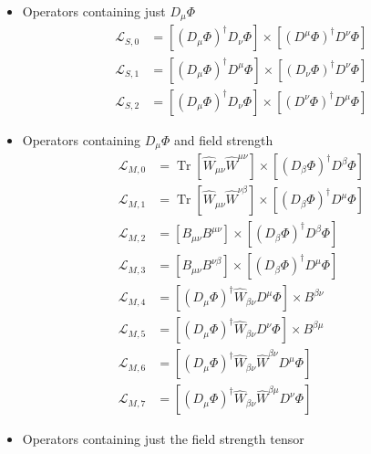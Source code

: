 \begin{itemize}
\item Operators containing just $D_\mu \Phi$
\begin{equation}
\begin{aligned}
\mathcal{L}_{S, 0} &=\left[\left(D_{\mu} \Phi\right)^{\dagger} D_{\nu} \Phi\right] \times\left[\left(D^{\mu} \Phi\right)^{\dagger} D^{\nu} \Phi\right] \\
\mathcal{L}_{S, 1} &=\left[\left(D_{\mu} \Phi\right)^{\dagger} D^{\mu} \Phi\right] \times\left[\left(D_{\nu} \Phi\right)^{\dagger} D^{\nu} \Phi\right] \\
\mathcal{L}_{S, 2} &=\left[\left(D_{\mu} \Phi\right)^{\dagger} D_{\nu} \Phi\right] \times\left[\left(D^{\nu} \Phi\right)^{\dagger} D^{\mu} \Phi\right]
\end{aligned}
\end{equation}
\item Operators containing $D_\mu \Phi$ and field strength 
\begin{equation}
\begin{aligned}
\mathcal{L}_{M, 0} &=\operatorname{Tr}\left[\hat{W}_{\mu \nu} \hat{W}^{\mu \nu}\right] \times\left[\left(D_{\beta} \Phi\right)^{\dagger} D^{\beta} \Phi\right] \\
\mathcal{L}_{M, 1} &=\operatorname{Tr}\left[\hat{W}_{\mu \nu} \hat{W}^{\nu \beta}\right] \times\left[\left(D_{\beta} \Phi\right)^{\dagger} D^{\mu} \Phi\right] \\
\mathcal{L}_{M, 2} &=\left[B_{\mu \nu} B^{\mu \nu}\right] \times\left[\left(D_{\beta} \Phi\right)^{\dagger} D^{\beta} \Phi\right] \\
\mathcal{L}_{M, 3} &=\left[B_{\mu \nu} B^{\nu \beta}\right] \times\left[\left(D_{\beta} \Phi\right)^{\dagger} D^{\mu} \Phi\right] \\
\mathcal{L}_{M, 4} &=\left[\left(D_{\mu} \Phi\right)^{\dagger} \hat{W}_{\beta \nu} D^{\mu} \Phi\right] \times B^{\beta \nu} \\
\mathcal{L}_{M, 5} &=\left[\left(D_{\mu} \Phi\right)^{\dagger} \hat{W}_{\beta \nu} D^{\nu} \Phi\right] \times B^{\beta \mu} \\
\mathcal{L}_{M, 6} &=\left[\left(D_{\mu} \Phi\right)^{\dagger} \hat{W}_{\beta \nu} \hat{W}^{\beta \nu} D^{\mu} \Phi\right] \\
\mathcal{L}_{M, 7} &=\left[\left(D_{\mu} \Phi\right)^{\dagger} \hat{W}_{\beta \nu} \hat{W}^{\beta \mu} D^{\nu} \Phi\right]
\end{aligned}
\end{equation}
\item Operators containing just the field strength tensor

\end{itemize}
